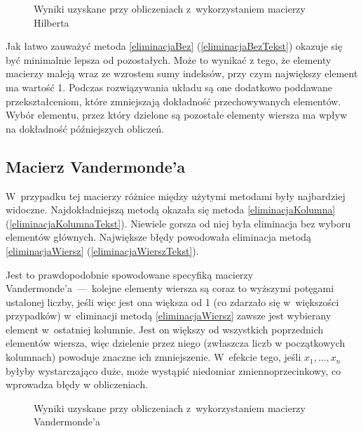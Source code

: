 \documentclass[a4paper]{article}
\begin{document}
\begin{figure}[H] 
\centering
\caption{Wyniki uzyskane przy obliczeniach z~wykorzystaniem macierzy Hilberta}
\label{fig:hilbert}
\end{figure}

Jak łatwo zauważyć metoda \ref{eliminacjaBez} (\ref{eliminacjaBezTekst}) okazuje się być minimalnie lepsza od pozostałych. Może to wynikać z tego, że elementy macierzy maleją
wraz ze wzrostem sumy indeksów, przy czym największy element ma wartość 1. Podczas rozwiązywania układu są one dodatkowo poddawane przekształceniom, które zmniejszają dokładność
przechowywanych elementów. Wybór elementu, przez który dzielone są pozostałe elementy wiersza ma wpływ na dokładność późniejszych obliczeń.

\subsection{Macierz Vandermonde'a}\label{sec:vandermond}
W~przypadku tej macierzy różnice między użytymi metodami były najbardziej widoczne. Najdokładniejszą metodą okazała się metoda \ref{eliminacjaKolumna} (\ref{eliminacjaKolumnaTekst}). Niewiele gorsza
od niej była eliminacja bez wyboru elementów głównych. Największe błędy powodowała eliminacja metodą \ref{eliminacjaWiersz} (\ref{eliminacjaWierszTekst}).

Jest to prawdopodobnie spowodowane specyfiką 
macierzy Vandermonde'a~---~kolejne elementy wiersza są coraz to wyższymi potęgami ustalonej liczby, jeśli więc jest ona większa od 1 (co zdarzało się w~większości przypadków) 
w~eliminacji metodą \ref{eliminacjaWiersz} zawsze jest wybierany element w~ostatniej kolumnie. Jest on większy od wszystkich poprzednich elementów wiersza, więc dzielenie przez niego (zwłaszcza liczb w początkowych 
kolumnach) powoduje znaczne ich zmniejszenie. W~efekcie tego, jeśli $x_1,\dots,x_n$ byłyby wystarczająco duże, może wystąpić niedomiar zmiennoprzecinkowy, co wprowadza błędy w obliczeniach. 

\begin{figure}[H]
 \centering
\caption{Wyniki uzyskane przy obliczeniach z~wykorzystaniem macierzy Vandermonde'a}
\label{fig:vandermond}
\end{figure}
\end{document}
